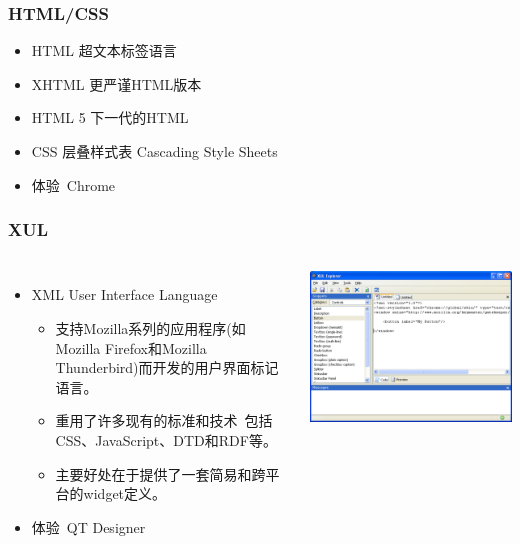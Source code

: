 \documentclass{beamer}
\begin{document}
\begin{frame}
	\frametitle{HTML/CSS}
	\beamertemplatetransparentcovereddynamicmedium
	\begin{itemize}
		\item HTML 超文本标签语言
	    \item XHTML 更严谨HTML版本
	    \item HTML 5 下一代的HTML
	    \item CSS 层叠样式表 Cascading Style Sheets
	    \pause
	    \item 体验~{\tiny Chrome}
	\end{itemize}
\end{frame}

\begin{frame}
	\frametitle{XUL}
	\beamertemplatetransparentcovereddynamicmedium
	\begin{columns}
	\begin{itemize}
		\item XML User Interface Language
		\begin{itemize}
			\item 支持Mozilla系列的应用程序{\tiny (如Mozilla Firefox和Mozilla Thunderbird)}而开发的用户界面标记语言。
			\item 重用了许多现有的标准和技术~{\tiny 包括CSS、JavaScript、DTD和RDF等。}
			\item 主要好处在于提供了一套简易和跨平台的widget定义。
		\end{itemize}
		\pause
		\item 体验~{\tiny QT Designer}
	\end{itemize}
	\includegraphics[width=\textwidth]{images/xulexplorer.png}
	\end{columns}
\end{frame}
\end{document}

